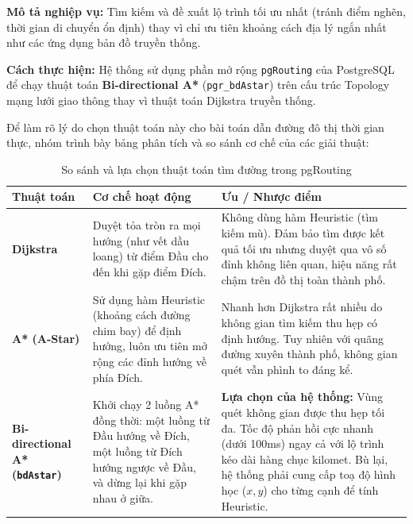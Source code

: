 \textbf{Mô tả nghiệp vụ:} Tìm kiếm và đề xuất lộ trình tối ưu nhất (tránh điểm nghẽn, thời gian di chuyển ổn định) thay vì chỉ ưu tiên khoảng cách địa lý ngắn nhất như các ứng dụng bản đồ truyền thống.

\textbf{Cách thực hiện:}
Hệ thống sử dụng phần mở rộng \texttt{pgRouting} của PostgreSQL để chạy thuật toán \textbf{Bi-directional A*} (\texttt{pgr\_bdAstar}) trên cấu trúc Topology mạng lưới giao thông thay vì thuật toán Dijkstra truyền thống. 

Để làm rõ lý do chọn thuật toán này cho bài toán dẫn đường đô thị thời gian thực, nhóm trình bày bảng phân tích và so sánh cơ chế của các giải thuật:

\begin{table}[H]
    \centering
    \small
    \renewcommand{\arraystretch}{1.5}
    \begin{tabular}{|p{2.5cm}|p{5cm}|p{7cm}|}
        \hline
        \textbf{Thuật toán} & \textbf{Cơ chế hoạt động} & \textbf{Ưu / Nhược điểm} \\
        \hline
        \textbf{Dijkstra} & Duyệt tỏa tròn ra mọi hướng (như vết dầu loang) từ điểm Đầu cho đến khi gặp điểm Đích. & Không dùng hàm Heuristic (tìm kiếm mù). Đảm bảo tìm được kết quả tối ưu nhưng duyệt qua vô số đỉnh không liên quan, hiệu năng rất chậm trên đồ thị toàn thành phố. \\
        \hline
        \textbf{A* (A-Star)} & Sử dụng hàm Heuristic (khoảng cách đường chim bay) để định hướng, luôn ưu tiên mở rộng các đỉnh hướng về phía Đích. & Nhanh hơn Dijkstra rất nhiều do không gian tìm kiếm thu hẹp có định hướng. Tuy nhiên với quãng đường xuyên thành phố, không gian quét vẫn phình to đáng kể. \\
        \hline
        \textbf{Bi-directional A* (\texttt{bdAstar})} & Khởi chạy 2 luồng A* đồng thời: một luồng từ Đầu hướng về Đích, một luồng từ Đích hướng ngược về Đầu, và dừng lại khi gặp nhau ở giữa. & \textbf{Lựa chọn của hệ thống:} Vùng quét không gian được thu hẹp tối đa. Tốc độ phản hồi cực nhanh (dưới 100ms) ngay cả với lộ trình kéo dài hàng chục kilomet. Bù lại, hệ thống phải cung cấp toạ độ hình học ($x,y$) cho từng cạnh để tính Heuristic. \\
        \hline
    \end{tabular}
    \caption{So sánh và lựa chọn thuật toán tìm đường trong pgRouting}
    \label{tab:routing_algo_comparison}
\end{table}

